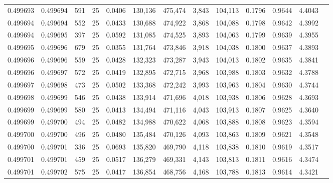 \begin{tabular}{rrrrrrrrrrrrr}
0.499693 & 0.499694 &   591 &  25 &                                     0.0406 & 130,136 & 475,474 &   3,843 & 104,113 & 0.1796 & 0.9644 & 4.4043 \\
0.499694 & 0.499694 &   552 &  25 &                                     0.0433 & 130,688 & 474,922 &   3,868 & 104,088 & 0.1798 & 0.9642 & 4.3992 \\
0.499694 & 0.499695 &   397 &  25 &                                     0.0592 & 131,085 & 474,525 &   3,893 & 104,063 & 0.1799 & 0.9639 & 4.3955 \\
0.499695 & 0.499696 &   679 &  25 &                                     0.0355 & 131,764 & 473,846 &   3,918 & 104,038 & 0.1800 & 0.9637 & 4.3893 \\
0.499696 & 0.499696 &   559 &  25 &                                     0.0428 & 132,323 & 473,287 &   3,943 & 104,013 & 0.1802 & 0.9635 & 4.3841 \\
0.499696 & 0.499697 &   572 &  25 &                                     0.0419 & 132,895 & 472,715 &   3,968 & 103,988 & 0.1803 & 0.9632 & 4.3788 \\
0.499697 & 0.499698 &   473 &  25 &                                     0.0502 & 133,368 & 472,242 &   3,993 & 103,963 & 0.1804 & 0.9630 & 4.3744 \\
0.499698 & 0.499699 &   546 &  25 &                                     0.0438 & 133,914 & 471,696 &   4,018 & 103,938 & 0.1806 & 0.9628 & 4.3693 \\
0.499699 & 0.499699 &   580 &  25 &                                     0.0413 & 134,494 & 471,116 &   4,043 & 103,913 & 0.1807 & 0.9625 & 4.3640 \\
0.499699 & 0.499700 &   494 &  25 &                                     0.0482 & 134,988 & 470,622 &   4,068 & 103,888 & 0.1808 & 0.9623 & 4.3594 \\
0.499700 & 0.499700 &   496 &  25 &                                     0.0480 & 135,484 & 470,126 &   4,093 & 103,863 & 0.1809 & 0.9621 & 4.3548 \\
0.499700 & 0.499701 &   336 &  25 &                                     0.0693 & 135,820 & 469,790 &   4,118 & 103,838 & 0.1810 & 0.9619 & 4.3517 \\
0.499701 & 0.499701 &   459 &  25 &                                     0.0517 & 136,279 & 469,331 &   4,143 & 103,813 & 0.1811 & 0.9616 & 4.3474 \\
0.499701 & 0.499702 &   575 &  25 &                                     0.0417 & 136,854 & 468,756 &   4,168 & 103,788 & 0.1813 & 0.9614 & 4.3421 \\

\end{tabular}
